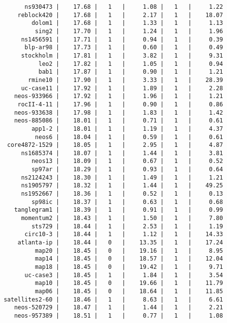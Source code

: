 \begin{lstlisting}
          ns930473 |    17.68 |   1   |     1.08 |   1   |     1.22
        reblock420 |    17.68 |   1   |     2.17 |   1   |    18.07
            dolom1 |    17.68 |   1   |     1.33 |   1   |     1.13
             sing2 |    17.70 |   1   |     1.24 |   1   |     1.96
         ns1456591 |    17.71 |   1   |     0.94 |   1   |     0.39
          blp-ar98 |    17.73 |   1   |     0.60 |   1   |     0.49
         stockholm |    17.81 |   1   |     3.82 |   1   |     9.31
              leo2 |    17.82 |   1   |     1.05 |   1   |     0.94
              bab1 |    17.87 |   1   |     0.90 |   1   |     1.21
           rmine10 |    17.90 |   1   |     3.33 |   1   |    28.39
         uc-case11 |    17.92 |   1   |     1.89 |   1   |     2.28
       neos-933966 |    17.92 |   1   |     1.96 |   1   |     1.21
        rocII-4-11 |    17.96 |   1   |     0.90 |   1   |     0.86
       neos-933638 |    17.98 |   1   |     1.83 |   1   |     1.42
       neos-885086 |    18.01 |   1   |     0.71 |   1   |     0.61
            app1-2 |    18.01 |   1   |     1.19 |   1   |     4.37
             neos6 |    18.04 |   1   |     0.59 |   1   |     0.61
     core4872-1529 |    18.05 |   1   |     2.95 |   1   |     4.87
         ns1685374 |    18.07 |   1   |     1.44 |   1   |     3.81
            neos13 |    18.09 |   1   |     0.67 |   1   |     0.52
            sp97ar |    18.29 |   1   |     0.93 |   1   |     0.64
         ns2124243 |    18.30 |   1   |     1.49 |   1   |     1.21
         ns1905797 |    18.32 |   1   |     1.44 |   1   |    49.25
         ns1952667 |    18.36 |   1   |     0.52 |   1   |     0.13
            sp98ic |    18.37 |   1   |     0.63 |   1   |     0.68
       tanglegram1 |    18.39 |   1   |     0.91 |   1   |     0.99
         momentum2 |    18.43 |   1   |     1.50 |   1   |     7.80
            sts729 |    18.44 |   1   |     2.53 |   1   |     1.19
          circ10-3 |    18.44 |   1   |     1.12 |   1   |    14.33
        atlanta-ip |    18.44 |   0   |    13.35 |   1   |    17.24
             map20 |    18.45 |   0   |    19.16 |   1   |     8.95
             map14 |    18.45 |   0   |    18.57 |   1   |    12.04
             map18 |    18.45 |   0   |    19.42 |   1   |     9.71
          uc-case3 |    18.45 |   1   |     1.84 |   1   |     3.54
             map10 |    18.45 |   0   |    19.66 |   1   |    11.79
             map06 |    18.45 |   0   |    18.64 |   1   |    11.85
    satellites2-60 |    18.46 |   1   |     8.63 |   1   |     6.61
       neos-520729 |    18.47 |   1   |     1.44 |   1   |     2.21
       neos-957389 |    18.51 |   1   |     0.77 |   1   |     1.08

\end{lstlisting}
